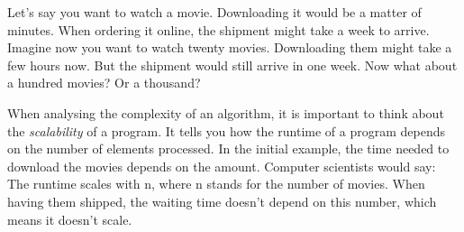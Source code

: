 
Let's say you want to watch a movie. Downloading it would be a matter of minutes. When ordering it online, the shipment might take a week to arrive. Imagine now you want to watch twenty movies. Downloading them might take a few hours now. But the shipment would still arrive in one week. Now what about a hundred movies? Or a thousand?

When analysing the complexity of an algorithm, it is important to think about the \emph{scalability} of a program. It tells you how the runtime of a program depends on the number of elements processed. In the initial example, the time needed to download the movies depends on the amount. Computer scientists would say: The runtime scales with n, where n stands for the number of movies. When having them shipped, the waiting time doesn't depend on this number, which means it doesn't scale.

